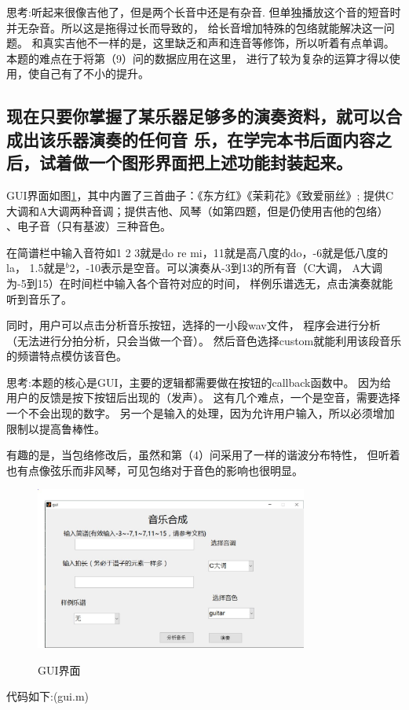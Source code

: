 \documentclass{ctexart}
\begin{document}
        思考:听起来很像吉他了，但是两个长音中还是有杂音.
        但单独播放这个音的短音时并无杂音。所以这是拖得过长而导致的，
        给长音增加特殊的包络就能解决这一问题。
        和真实吉他不一样的是，这里缺乏和声和连音等修饰，所以听着有点单调。
        本题的难点在于将第（9）问的数据应用在这里，
        进行了较为复杂的运算才得以使用，使自己有了不小的提升。

    \subsection{
            现在只要你掌握了某乐器足够多的演奏资料，就可以合成出该乐器演奏的任何音
            乐，在学完本书后面内容之后，试着做一个图形界面把上述功能封装起来。
        }
       
        GUI界面如图\ref{112}，其中内置了三首曲子：《东方红》《茉莉花》《致爱丽丝》;
        提供C大调和A大调两种音调；提供吉他、风琴（如第四题，但是仍使用吉他的包络）
        、电子音（只有基波）三种音色。

        在简谱栏中输入音符如1 2 3就是do re mi，11就是高八度的do，-6就是低八度的la，
        1.5就是$^b2$，-10表示是空音。可以演奏从-3到13的所有音（C大调，
        A大调为-5到15）在时间栏中输入各个音符对应的时间，
        样例乐谱选无，点击演奏就能听到音乐了。
     
        同时，用户可以点击分析音乐按钮，选择的一小段wav文件，
        程序会进行分析（无法进行分拍分析，只会当做一个音）。
        然后音色选择custom就能利用该段音乐的频谱特点模仿该音色。




        思考:本题的核心是GUI，主要的逻辑都需要做在按钮的callback函数中。
        因为给用户的反馈是按下按钮后出现的（发声）。
        这有几个难点，一个是空音，需要选择一个不会出现的数字。
        另一个是输入的处理，因为允许用户输入，所以必须增加限制以提高鲁棒性。

        有趣的是，当包络修改后，虽然和第（4）问采用了一样的谐波分布特性，
        但听着也有点像弦乐而非风琴，可见包络对于音色的影响也很明显。
        \begin{figure}
            \centering
            \includegraphics[width=0.8\textwidth]{fmt/1_12.jpg}\\
            \caption{GUI界面\label{112}}
        \end{figure}

        代码如下:(gui.m)
        
\end{document}
